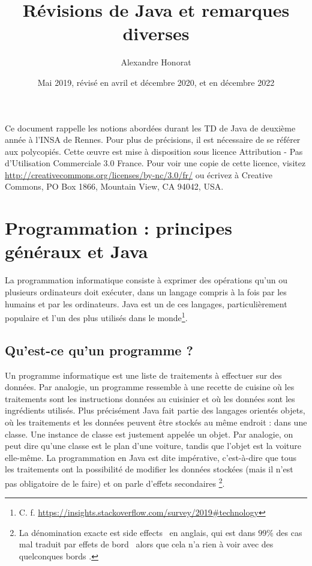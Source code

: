 \documentclass[10pt]{article}
\title{Révisions de Java et remarques diverses}
\author{Alexandre Honorat}
\date{Mai 2019, révisé en avril et décembre 2020, et en décembre 2022}
\begin{document}
\maketitle

Ce document rappelle les notions abordées durant les TD de Java de deuxième année
à l'INSA de Rennes. Pour plus de précisions, il est nécessaire de se référer aux polycopiés.
Cette œuvre est mise à disposition sous licence
Attribution - Pas d’Utilisation Commerciale 3.0 France.
Pour voir une copie de cette licence, visitez \url{http://creativecommons.org/licenses/by-nc/3.0/fr/}
ou écrivez à Creative Commons, PO Box 1866, Mountain View, CA 94042, USA.

\section{Programmation : principes généraux et Java}


La programmation informatique consiste à exprimer des opérations
qu'un ou plusieurs ordinateurs doit exécuter, dans un langage compris
à la fois par les humains et par les ordinateurs. Java est un de ces langages,
particulièrement populaire et l'un des plus utilisés dans le monde\footnote{C. f. \url{https://insights.stackoverflow.com/survey/2019\#technology}}.


\subsection{Qu'est-ce qu'un programme ?}

Un programme informatique est une liste de traitements à effectuer sur des données. Par analogie, un programme
ressemble à une recette de cuisine où les traitements sont les instructions données au cuisinier
et où les données sont les ingrédients utilisés. Plus précisément Java fait partie des langages
orientés objets, où les traitements et les données peuvent être stockés au même endroit : dans une
classe. Une instance de classe est justement appelée un objet. Par analogie, on peut dire qu'une classe
est le plan d'une voiture, tandis que l'objet est la voiture elle-même.
La programmation en Java est dite impérative, c'est-à-dire que tous les traitements
ont la possibilité de modifier les données stockées (mais il n'est pas obligatoire de le faire) et on parle
d'effets secondaires \footnote{La dénomination exacte est \og side effects \fg~en anglais, qui est dans $99\%$
des cas mal traduit par \og effets de bord \fg~alors que cela n'a rien à voir avec des quelconques \og bords \fg.}.
\end{document}
